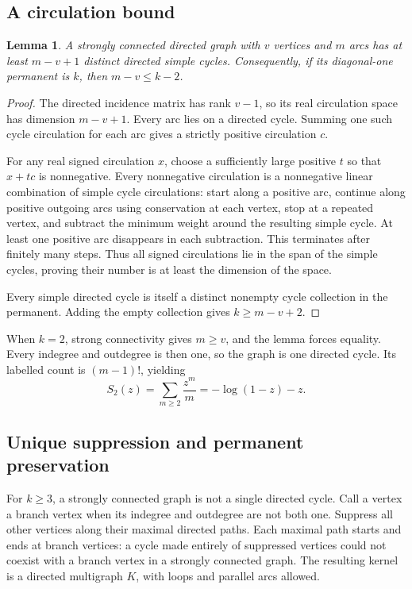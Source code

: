 \documentclass[11pt]{article}
\newtheorem{lemma}[theorem]{Lemma}
\theoremstyle{definition}\newtheorem{definition}[theorem]{Definition}
\theoremstyle{remark}\newtheorem{remark}[theorem]{Remark}
\begin{document}
\subsection{A circulation bound}
\begin{lemma}\label{fpm:lem:cycles}
A strongly connected directed graph with $v$ vertices and $m$ arcs has at least $m-v+1$ distinct directed simple cycles. Consequently, if its diagonal-one permanent is $k$, then $m-v\le k-2$.
\end{lemma}
\begin{proof}
The directed incidence matrix has rank $v-1$, so its real circulation space has dimension $m-v+1$. Every arc lies on a directed cycle. Summing one such cycle circulation for each arc gives a strictly positive circulation $c$.

For any real signed circulation $x$, choose a sufficiently large positive $t$ so that $x+tc$ is nonnegative. Every nonnegative circulation is a nonnegative linear combination of simple cycle circulations: start along a positive arc, continue along positive outgoing arcs using conservation at each vertex, stop at a repeated vertex, and subtract the minimum weight around the resulting simple cycle. At least one positive arc disappears in each subtraction. This terminates after finitely many steps. Thus all signed circulations lie in the span of the simple cycles, proving their number is at least the dimension of the space.

Every simple directed cycle is itself a distinct nonempty cycle collection in the permanent. Adding the empty collection gives $k\ge m-v+2$.
\end{proof}

When $k=2$, strong connectivity gives $m\ge v$, and the lemma forces equality. Every indegree and outdegree is then one, so the graph is one directed cycle. Its labelled count is $(m-1)!$, yielding
\begin{equation}\label{fpm:eq:S2}
 S_2(z)=\sum_{m\ge2}\frac{z^m}{m}=-\log(1-z)-z.
\end{equation}

\subsection{Unique suppression and permanent preservation}
For $k\ge3$, a strongly connected graph is not a single directed cycle. Call a vertex a branch vertex when its indegree and outdegree are not both one. Suppress all other vertices along their maximal directed paths. Each maximal path starts and ends at branch vertices: a cycle made entirely of suppressed vertices could not coexist with a branch vertex in a strongly connected graph. The resulting kernel is a directed multigraph $K$, with loops and parallel arcs allowed.
\end{document}

